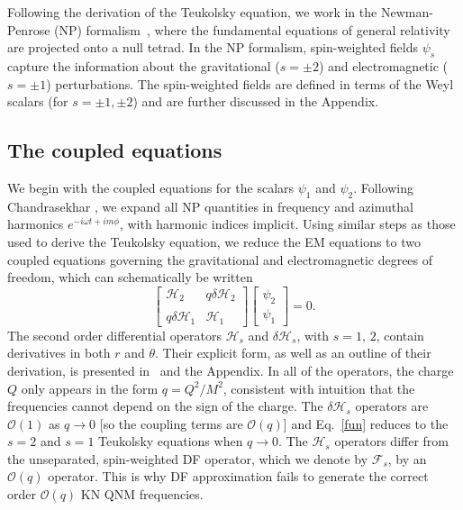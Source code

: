 \begin{refsection}
Following the derivation of the Teukolsky equation, we work in the Newman-Penrose (NP) formalism~\cite{NewmanPenrose1962,ChandraBook,StewartBook}, where the fundamental equations of general relativity are projected onto a null tetrad. 
In the NP formalism, spin-weighted fields $\psi_s$ capture the information about the gravitational ($s=\pm 2$) and electromagnetic ($s =\pm 1$) perturbations. The spin-weighted fields are defined in terms of the Weyl scalars (for $s = \pm 1, \pm 2$) and are further discussed in the Appendix. 

\subsection{The coupled equations} 

We begin with the coupled equations for the scalars $\psi_1$ and $\psi_2$. Following Chandrasekhar \cite{ChandraBook}, we expand all NP quantities in frequency and azimuthal harmonics $e^{-i\omega t+im\phi}$, with harmonic indices implicit. Using similar steps as those used to derive the Teukolsky equation, we reduce the EM equations to two coupled equations governing the gravitational and electromagnetic degrees of freedom, which can schematically be written  
\begin{equation}
\begin{bmatrix}
\mathcal{H}_2 & q\delta \mathcal{H}_2 \\ \\
q \delta \mathcal{H}_1 &  \mathcal{H}_1 
\end{bmatrix}
\begin{bmatrix}
\psi_2 \\
\psi_1
\end{bmatrix}
=0.
\label{fun}
\end{equation}
The second order differential operators $\mathcal{H}_s$ and $\delta \mathcal{H}_s$, with $s =1,\,2$, contain derivatives in both $r$ and $\theta$. Their explicit form, as well as an outline of their derivation, is presented in~\cite{ChandraBook} and the Appendix. In all of the operators, the charge $Q$ only appears in the form $q = Q^2/M^2$, consistent with intuition that the frequencies cannot depend on the sign of the charge.
The $\delta \mathcal{H}_s$ operators are $\mathcal{O}(1)$ as $q \to 0$ [so the coupling terms are $\mathcal{O}(q)$] and Eq.~\eqref{fun} reduces to the $s=2$ and $s=1$ Teukolsky equations when $q \to 0$. The $\mathcal{H}_s$ operators differ from the unseparated, spin-weighted DF operator, which we denote by
$\mathcal{F}_s$, by an $\mathcal{O}(q)$ operator. This is why DF approximation fails to generate the correct order $\mathcal{O}(q)$ KN QNM frequencies. 


\end{refsection}
